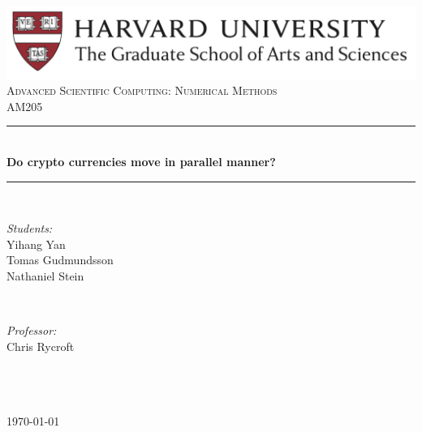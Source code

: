 \documentclass[12pt,twoside]{article}
\begin{document}
\thispagestyle{empty}
\newcommand{\HRule}{\rule{\linewidth}{0.5mm}} %

\begin{center} %
\vspace{5mm}
\includegraphics[scale=0.5]{Harvard}\\[3cm]
\textsc{\Large Advanced Scientific Computing: Numerical Methods}\\[0.5cm] %
\textsc{\large AM205}\\[2cm] %

\HRule \\[0.4cm]
{ \huge \bfseries Do crypto currencies move in parallel manner?}\\[0.4cm] %
\HRule \\[2.5cm]



\begin{minipage}{0.4\textwidth}
\begin{flushleft} \large
\emph{Students:}\\
Yihang Yan\\
Tomas Gudmundsson\\
Nathaniel Stein\\
\end{flushleft}
\end{minipage}
~
\begin{minipage}{0.4\textwidth}
\begin{flushright} \large
\emph{Professor:} \\
Chris Rycroft \\%
\hspace{1mm}\\
 \hspace{1mm} \\
\end{flushright}
\end{minipage}\\[2cm]

{\large \today}\\[2cm]
\end{center}
\end{document}
